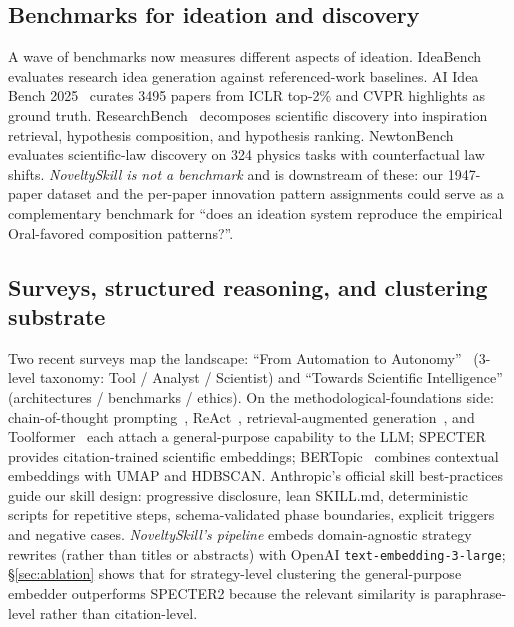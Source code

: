 \documentclass[10pt,a4paper]{article}
\begin{document}
\subsection{Benchmarks for ideation and discovery}
\label{subsec:related-benchmarks}

A wave of benchmarks now measures different aspects of ideation. IdeaBench~\cite{ideabench2024} evaluates research idea generation against referenced-work baselines. AI Idea Bench 2025~\cite{airesearchideas2025} curates 3495 papers from ICLR top-2\% and CVPR highlights as ground truth. ResearchBench~\cite{researchbench2025} decomposes scientific discovery into inspiration retrieval, hypothesis composition, and hypothesis ranking. NewtonBench~\cite{newtonbench2025} evaluates scientific-law discovery on 324 physics tasks with counterfactual law shifts. \emph{NoveltySkill is not a benchmark} and is downstream of these: our 1947-paper dataset and the per-paper innovation pattern assignments could serve as a complementary benchmark for ``does an ideation system reproduce the empirical Oral-favored composition patterns?''.

\subsection{Surveys, structured reasoning, and clustering substrate}
\label{subsec:related-substrate}

Two recent surveys map the landscape: ``From Automation to Autonomy''~\cite{from_automation_2025} (3-level taxonomy: Tool / Analyst / Scientist) and ``Towards Scientific Intelligence''~\cite{sci_intel_survey2025} (architectures / benchmarks / ethics). On the methodological-foundations side: chain-of-thought prompting~\cite{wei2022cot}, ReAct~\cite{yao2023react}, retrieval-augmented generation~\cite{lewis2020rag}, and Toolformer~\cite{schick2023toolformer} each attach a general-purpose capability to the LLM; SPECTER~\cite{cohan2020specter} provides citation-trained scientific embeddings; BERTopic~\cite{grootendorst2022bertopic} combines contextual embeddings with UMAP and HDBSCAN. Anthropic's official skill best-practices~\cite{anthropic_skill_bp_2025} guide our skill design: progressive disclosure, lean SKILL.md, deterministic scripts for repetitive steps, schema-validated phase boundaries, explicit triggers and negative cases. \emph{NoveltySkill's pipeline} embeds domain-agnostic strategy rewrites (rather than titles or abstracts) with OpenAI \texttt{text-embedding-3-large}; \S\ref{sec:ablation} shows that for strategy-level clustering the general-purpose embedder outperforms SPECTER2 because the relevant similarity is paraphrase-level rather than citation-level.
\end{document}
